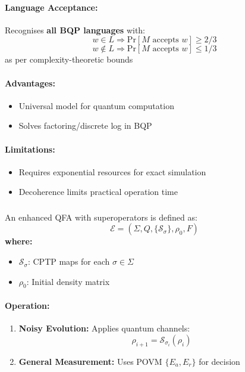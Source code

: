 \paragraph{Language Acceptance:}
Recognises \textbf{all BQP languages} \cite{shor1994algorithms} with:
\[
w \in L \Rightarrow \text{Pr}[M \text{ accepts } w] \geq 2/3
\]
\[
w \notin L \Rightarrow \text{Pr}[M \text{ accepts } w] \leq 1/3
\]
as per complexity-theoretic bounds \cite{nielsen2010quantum}

\paragraph{Advantages:}
\begin{itemize}
    \item Universal model for quantum computation
    \item Solves factoring/discrete log in BQP
\end{itemize}

\paragraph{Limitations:}
\begin{itemize}
    \item Requires exponential resources for exact simulation
    \item Decoherence limits practical operation time
\end{itemize}

\subsubsection{}
\label{subsec:eqfa}

\begin{definition}
An enhanced QFA with superoperators is defined as:
\[
\mathcal{E} = (\Sigma, Q, \{\mathcal{S}_\sigma\}, \rho_0, F)
\]
\textbf{where:}
\begin{itemize}
    \item $\mathcal{S}_\sigma$: CPTP maps for each $\sigma \in \Sigma$
    \item $\rho_0$: Initial density matrix
\end{itemize}
\end{definition}

\paragraph{Operation:}
\begin{enumerate}
    \item \textbf{Noisy Evolution:} Applies quantum channels:
    \[
    \rho_{i+1} = \mathcal{S}_{\sigma_i}(\rho_i)
    \]
    \item \textbf{General Measurement:} Uses POVM $\{E_a, E_r\}$ for decision
\end{enumerate}


